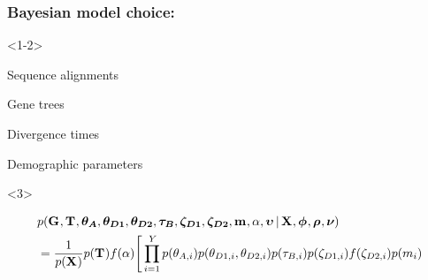 \begin{frame}[t]
    \frametitle{Bayesian model choice: \msb}
        \begin{onlyenv}<1-2>
        \smallskip
        \begin{mydescription}
            \item[\alignmentVector] Sequence alignments
            \item[\geneTreeVector] Gene trees
            \item[\divTimeMapVector] Divergence times
            \item[\demographicParamVector] Demographic parameters
        \end{mydescription}
        \end{onlyenv}
    \begin{onlyenv}<3>
    \bigskip
    \begin{displaybox}
    {\tiny
    \begin{equation*}
        \begin{split}
        & p(\geneTreeVector,
        \divTimeMapVector,
        \ancestralThetaVector,
        \descendantThetaVector{1}, \descendantThetaVector{2},
        \bottleTimeVector, \bottleScalarVector{1},
        \bottleScalarVector{2},
        \migrationRateVector,
        \locusRateHetShapeParameter,
        \locusMutationRateScalarVector \given
        \alignmentVector, \hkyModelVector, \ploidyScalarVector,
        \mutationRateScalarConstantVector) \\
        & = \frac{1}{p(\alignmentVector)}
        p(\divTimeMapVector)
        f(\locusRateHetShapeParameter)
        \Bigg[
        \prod_{i=1}^{\npairs{}}
        p(\ancestralTheta{i})
        p(\descendantTheta{1}{i}, \descendantTheta{2}{i})
        p(\bottleTime{i})
        p(\bottleScalar{1}{i}) f(\bottleScalar{2}{i})
        p(\migrationRate{i}) \\

\end{split}
\end{equation*}}
\end{displaybox}
\end{onlyenv}
\end{frame}
